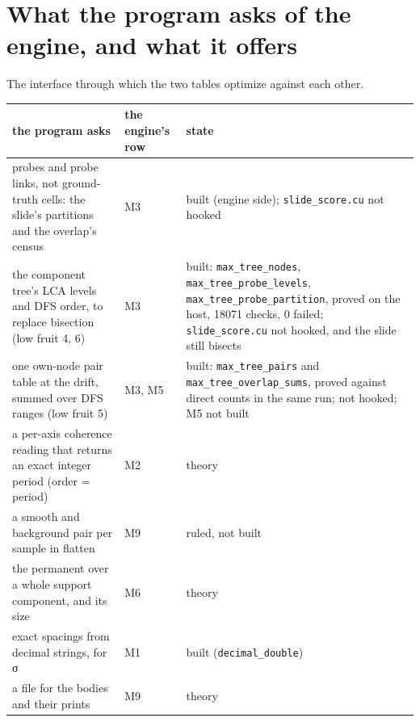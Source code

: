 \section{\texorpdfstring{What the program asks of the engine, and what it offers}{What the program asks of the engine, and what it offers}}

The interface through which the two tables optimize against each other.

{\small
\setlength{\tabcolsep}{6pt}
\begin{longtable}{>{\RaggedRight\arraybackslash}p{}>{\RaggedRight\arraybackslash}p{}>{\RaggedRight\arraybackslash}p{}}
\toprule
the program asks & the engine's row & state \\
\midrule
\endhead
probes and probe links, not ground-truth cells: the slide's partitions and the overlap's census & M3 & built (engine side); \texttt{slide\_\allowbreak{}score.\allowbreak{}cu} not hooked \\
the component tree's LCA levels and DFS order, to replace bisection (low fruit 4, 6) & M3 & built: \texttt{max\_\allowbreak{}tree\_\allowbreak{}nodes}, \texttt{max\_\allowbreak{}tree\_\allowbreak{}probe\_\allowbreak{}levels}, \texttt{max\_\allowbreak{}tree\_\allowbreak{}probe\_\allowbreak{}partition}, proved on the host, 18071 checks, 0 failed; \texttt{slide\_\allowbreak{}score.\allowbreak{}cu} not hooked, and the slide still bisects \\
one own-node pair table at the drift, summed over DFS ranges (low fruit 5) & M3, M5 & built: \texttt{max\_\allowbreak{}tree\_\allowbreak{}pairs} and \texttt{max\_\allowbreak{}tree\_\allowbreak{}overlap\_\allowbreak{}sums}, proved against direct counts in the same run; not hooked; M5 not built \\
a per-axis coherence reading that returns an exact integer period (order = period) & M2 & theory \\
a smooth and background pair per sample in flatten & M9 & ruled, not built \\
the permanent over a whole support component, and its size & M6 & theory \\
exact spacings from decimal strings, for σ & M1 & built (\texttt{decimal\_\allowbreak{}double}) \\
a file for the bodies and their prints & M9 & theory \\

\end{longtable}}
